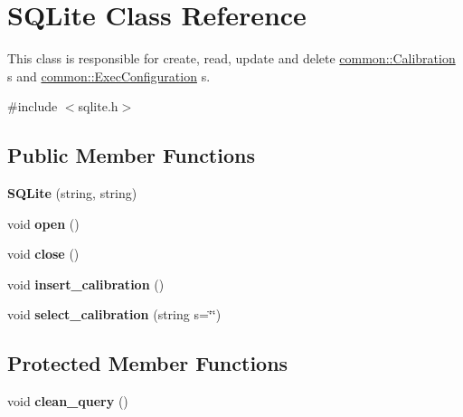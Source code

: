 \hypertarget{classSQLite}{}\section{S\+Q\+Lite Class Reference}
\label{classSQLite}


This class is responsible for create, read, update and delete \hyperlink{structcommon_1_1Calibration}{common\+::\+Calibration} \textquotesingle{}s and \hyperlink{structcommon_1_1ExecConfiguration}{common\+::\+Exec\+Configuration} \textquotesingle{}s.  




{\ttfamily \#include $<$sqlite.\+h$>$}

\subsection*{Public Member Functions}
\begin{DoxyCompactItemize}
\item 
{\bfseries S\+Q\+Lite} (string, string)\hypertarget{classSQLite_aec016ee26d918bb715383b7578118166}{}\label{classSQLite_aec016ee26d918bb715383b7578118166}

\item 
void {\bfseries open} ()\hypertarget{classSQLite_a2ba6d61d356aac7b2a0d7323ba997279}{}\label{classSQLite_a2ba6d61d356aac7b2a0d7323ba997279}

\item 
void {\bfseries close} ()\hypertarget{classSQLite_aac5338faf7580f6adb3560c91d58b54a}{}\label{classSQLite_aac5338faf7580f6adb3560c91d58b54a}

\item 
void {\bfseries insert\+\_\+calibration} ()\hypertarget{classSQLite_ae145e41fed72678f0e2900ec093ad323}{}\label{classSQLite_ae145e41fed72678f0e2900ec093ad323}

\item 
void {\bfseries select\+\_\+calibration} (string s=\char`\"{}\char`\"{})\hypertarget{classSQLite_aeb720971a449cc51d124251fa995cb5c}{}\label{classSQLite_aeb720971a449cc51d124251fa995cb5c}

\end{DoxyCompactItemize}
\subsection*{Protected Member Functions}
\begin{DoxyCompactItemize}
\item 
void {\bfseries clean\+\_\+query} ()\hypertarget{classSQLite_a3b7e7d4f78e02266bd7bb9b6eb4828ee}{}\label{classSQLite_a3b7e7d4f78e02266bd7bb9b6eb4828ee}

\end{DoxyCompactItemize}
